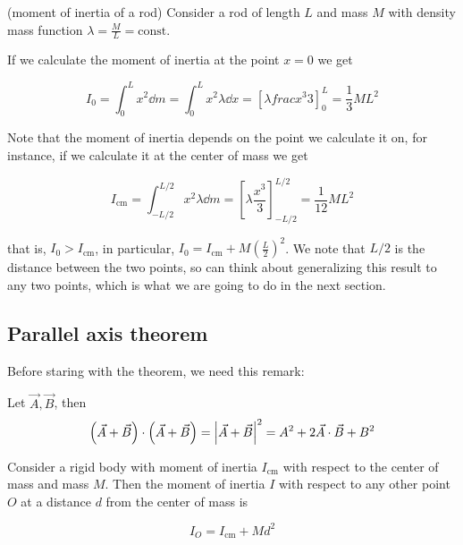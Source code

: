\documentclass[14pt]{extarticle}
\begin{document}
\begin{example}(moment of inertia of a rod)
    Consider a rod of length $L$ and mass $M$ with density mass function $\lambda = \frac{M}{L} = \text{const}$.

    If we calculate the moment of inertia at the point $x = 0$ we get

    \begin{equation}
        I_0 = \int_0^L x^2 \dd{m} = \int_0^L x^2 \lambda \dd{x} = \left[ \lambda frac{x^3}{3} \right]_0^L = \frac{1}{3} ML^2
    \end{equation}

    Note that the moment of inertia depends on the point we calculate it on, for instance, if we calculate it at the center of mass we get

    \begin{equation}
        I_{\text{cm}} = \int_{-L/2}^{L/2} x^2 \lambda \dd{m} = \left[ \lambda \frac{x^3}{3} \right]_{-L/2}^{L/2} = \frac{1}{12} ML^2
    \end{equation}


    that is, $I_0 > I_{\text{cm}}$, in particular, $I_0 = I_{\text{cm}} + M \left(\frac{L}{2}\right)^2$.
    We note that $L/2$ is the distance between the two points, so can think about generalizing this result to any two points, which is what we are going to do in the next section.
\end{example}

\subsection{Parallel axis theorem}

Before staring with the theorem, we need this remark:
\begin{remark}
    Let $\vec{A}, \vec{B}$, then
    \begin{equation}
        \left( \vec{A} + \vec{B} \right) \cdot \left( \vec{A} + \vec{B} \right) = \abs{\vec{A} + \vec{B}}^2 = A^2 + 2 \vec{A} \cdot \vec{B} + B^2
    \end{equation}
\end{remark}

\begin{theorem}
    Consider a rigid body with moment of inertia $I_{\text{cm}}$ with respect to the center of mass and mass $M$. Then the moment of inertia $I$ with respect to any other point $O$ at a distance $d$ from the center of mass is

    \begin{equation}
        I_O = I_{\text{cm}} + M d^2
    \end{equation}

    \label{thm:parallel_axis}
\end{theorem}
\end{document}
